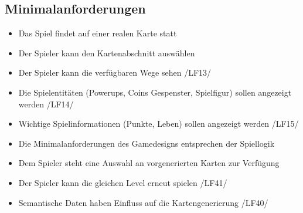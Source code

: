 \documentclass{article}
\begin{document}
\subsection{Minimalanforderungen}
\begin{itemize}
\item Das Spiel findet auf einer realen Karte statt
\item Der Spieler kann den Kartenabschnitt auswählen
\item Der Spieler kann die verfügbaren Wege sehen /LF13/
\item Die Spielentitäten (Powerups, Coins Gespenster, Spielfigur) sollen angezeigt werden /LF14/
\item Wichtige Spielinformationen (Punkte, Leben) sollen angezeigt werden /LF15/
\end{itemize}
\begin{itemize}
\item Die Minimalanforderungen des Gamedesigns entsprechen der Spiellogik
\end{itemize}
\begin{itemize}
\item Dem Spieler steht eine Auswahl an vorgenerierten Karten zur Verfügung
\item Der Spieler kann die gleichen Level erneut spielen /LF41/
\item Semantische Daten haben Einfluss auf die Kartengenerierung /LF40/
\end{itemize}
\end{document}
